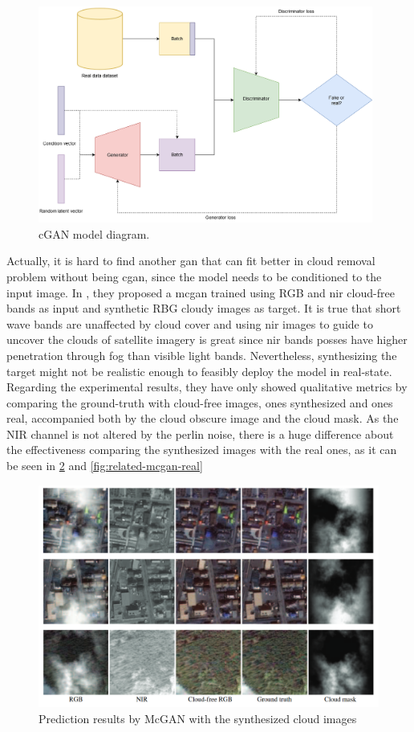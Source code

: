 \documentclass[../main.tex]{subfiles}
\begin{document}
\begin{figure}[H]
	\centering
	\includegraphics[width=11cm]{imgs/relatedwork/cgan.png}
	\caption{cGAN model diagram.}
	\label{fig:related-cgan-diagram}
\end{figure}	
Actually, it is hard to find another \gls{gan} that can fit better in cloud removal problem without being \gls{cgan}, since the model needs to be conditioned to the input image. In \cite{8014931}, they %
proposed a  \gls{mcgan} trained using RGB and \gls{nir} cloud-free bands as input and synthetic RBG cloudy images as target. It is true that short wave bands are unaffected by cloud cover and using \gls{nir} images to guide to uncover the clouds of satellite imagery is great since \gls{nir} bands posses have higher penetration through fog than visible light bands. Nevertheless, synthesizing the target might not be realistic enough to feasibly deploy the model in real-state. Regarding the experimental results, they have only showed qualitative metrics by comparing the ground-truth with cloud-free images, ones synthesized and ones real, accompanied both by the cloud obscure image and the cloud mask.  As the NIR channel is not altered by the perlin noise, there is a huge difference about the effectiveness comparing the synthesized images with the real ones, as it can be seen in \ref{fig:related-mcgan-synthesized} and \ref{fig:related-mcgan-real}
\begin{figure}[H]
	\centering
	\includegraphics[width=12cm]{imgs/relatedwork/mcgan-synthesized.png}
	\caption{Prediction results by McGAN with the synthesized cloud images}
	\label{fig:related-mcgan-synthesized}
\end{figure}
\end{document}
